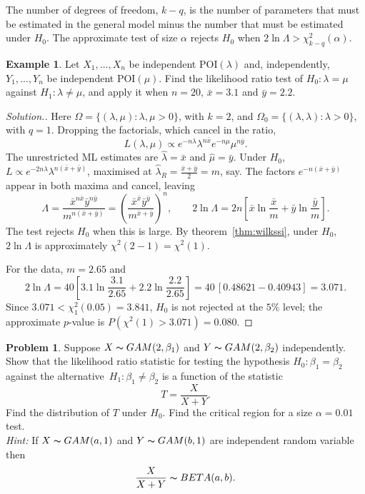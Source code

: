 \documentclass[12pt,a4paper]{report}
\theoremstyle{definition}
\newtheorem{exa}[thm]{Example}
\newtheorem{problemx}{Problem}[section]
\newenvironment{problem}{\begin{problemx}}{\end{problemx}}
\newenvironment{solution}
  {\renewcommand{\qedsymbol}{}\begin{proof}[\textit{Solution}.]}
  {\end{proof}}
\begin{document}
The number of degrees of freedom, $k - q$, is the number of parameters that must be
estimated in the general model minus the number that must be estimated under $H_0$.
The approximate test of size $\alpha$ rejects $H_0$ when $2\ln\Lambda>\chi^2_{k - q}(\alpha)$.

\begin{exa}
\label{ex:lrtpoisson}
Let $X_1, \dots, X_n$ be independent $\text{POI}(\lambda)$ and, independently,
$Y_1, \dots, Y_n$ be independent $\text{POI}(\mu)$. Find the likelihood ratio test of
$H_0\colon\lambda = \mu$ against $H_1\colon\lambda\ne\mu$, and apply it when $n = 20$,
$\bar x = 3.1$ and $\bar y = 2.2$.
\end{exa}

\begin{solution}
Here $\Omega = \{(\lambda, \mu) : \lambda, \mu>0\}$, with $k = 2$, and
$\Omega_0 = \{(\lambda, \lambda) : \lambda>0\}$, with $q = 1$. Dropping the factorials, which
cancel in the ratio,
\[L(\lambda, \mu)\propto e^{-n\lambda}\lambda^{n\bar x}e^{-n\mu}\mu^{n\bar y} .\]
The unrestricted ML estimates are $\hat\lambda = \bar x$ and $\hat\mu = \bar y$. Under $H_0$,
$L\propto e^{-2n\lambda}\lambda^{n(\bar x + \bar y)}$, maximised at
$\hat\lambda_R = \frac{\bar x + \bar y}{2} = m$, say. The factors $e^{-n(\bar x + \bar y)}$ appear in
both maxima and cancel, leaving
\[\Lambda = \frac{\bar x^{n\bar x}\bar y^{n\bar y}}{m^{n(\bar x + \bar y)}}
= \left(\frac{\bar x^{\bar x}\bar y^{\bar y}}{m^{\bar x + \bar y}}\right)^n,\qquad
2\ln\Lambda = 2n\left[\bar x\ln\frac{\bar x}{m} + \bar y\ln\frac{\bar y}{m}\right].\]
The test rejects $H_0$ when this is large. By theorem~\ref{thm:wilkssi}, under $H_0$,
$2\ln\Lambda$ is approximately $\chi^2(2 - 1) = \chi^2(1)$.

For the data, $m = 2.65$ and
\[2\ln\Lambda = 40\left[3.1\ln\frac{3.1}{2.65} + 2.2\ln\frac{2.2}{2.65}\right] = 40\,[0.48621 - 0.40943] = 3.071 .\]
Since $3.071<\chi^2_1(0.05) = 3.841$, $H_0$ is not rejected at the $5\%$ level; the
approximate $p$-value is $P(\chi^2(1)>3.071) = 0.080$.
\end{solution}

\begin{problem}
Suppose $X\thicksim GAM(2,\beta_1)$ and $Y\thicksim GAM(2,\beta_2)$ independently. Show that the likelihood ratio statistic for testing the hypothesis $H_0: \beta_1 = \beta_2\,$ against the alternative $\, H_1:\beta_1\neq \beta_2$ is a function of the statistic 
\[T = \frac{X}{X + Y}.\]
Find the distribution of $T$ under $H_0$. Find the critical region for a size $\alpha = 0.01$ test.\\

\textit{Hint:} If $X\thicksim GAM(a,1)$ and $Y\thicksim GAM(b,1)$ are independent random variable then \[\frac{X}{X + Y} \thicksim BETA(a,b).\]
\end{problem}
\end{document}
